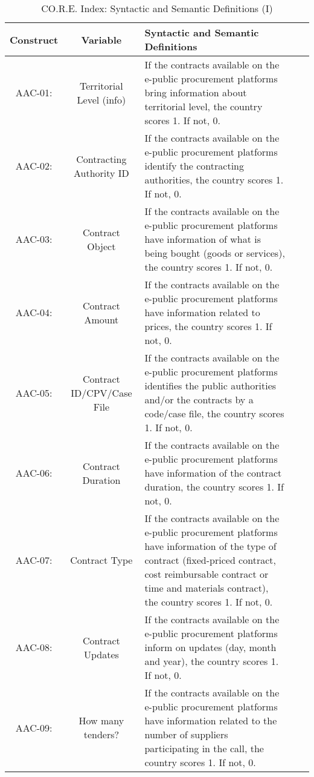 \documentclass[a4paper, twoside]{report}
\begin{document}
\begin{table}[htbp]
  \centering
  \caption{CO.R.E. Index: Syntactic and Semantic Definitions (I)}
   \tabcolsep=0.80cm
	\renewcommand{\arraystretch}{2.3}
	\begin{adjustbox}{max width=\linewidth}
       \begin{tabular}{ccp{30em}p{35em}p{31.335em}}
    \toprule
    Construct & Variable & Syntactic and Semantic Definitions \\
    \midrule
    AAC-01: & Territorial Level (info) & If the contracts available on the e-public procurement platforms bring information about territorial level, the country scores 1. If not, 0. \\
    AAC-02: & Contracting Authority ID & If the contracts available on the e-public procurement platforms identify the contracting authorities, the country scores 1. If not, 0. \\
    AAC-03: & Contract Object & If the contracts available on the e-public procurement platforms have information of what is being bought (goods or services), the country scores 1. If not, 0. \\
    AAC-04: & Contract Amount & If the contracts available on the e-public procurement platforms have information related to prices, the country scores 1. If not, 0. \\
    AAC-05: & Contract ID/CPV/Case File & If the contracts available on the e-public procurement platforms identifies the public authorities and/or the contracts by a code/case file, the country scores 1. If not, 0. \\
    AAC-06: & Contract Duration & If the contracts available on the e-public procurement platforms have information of the contract duration, the country scores 1. If not, 0. \\
    AAC-07: & Contract Type & If the contracts available on the e-public procurement platforms have information of the type of contract (fixed-priced contract, cost reimbursable contract or time and materials contract), the country scores 1. If not, 0. \\
    AAC-08: & Contract Updates & If the contracts available on the e-public procurement platforms inform on updates (day, month and year), the country scores 1. If not, 0. \\
    AAC-09: & How many tenders? & If the contracts available on the e-public procurement platforms have information related to the number of suppliers participating in the call, the country scores 1. If not, 0. \\

\end{tabular}
\end{adjustbox}
\end{table}
\end{document}
